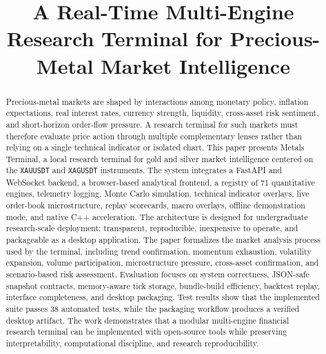 \documentclass[conference]{IEEEtran}
\begin{document}
\pagestyle{fancy}
\fancyhf{}
\fancyhead[R]{\scriptsize \thepage}
\renewcommand{\headrulewidth}{0pt}
\setlength{\headheight}{13.6pt}

\title{A Real-Time Multi-Engine Research Terminal for Precious-Metal Market Intelligence}

\author{
}

\maketitle
\thispagestyle{fancy}

\begin{abstract}
Precious-metal markets are shaped by interactions among monetary policy,
inflation expectations, real interest rates, currency strength, liquidity,
cross-asset risk sentiment, and short-horizon order-flow pressure. A research
terminal for such markets must therefore evaluate price action through
multiple complementary lenses rather than relying on a single technical
indicator or isolated chart. This paper presents Metals Terminal, a local
research terminal for gold and silver market intelligence centered on the
\texttt{XAUUSDT} and \texttt{XAGUSDT} instruments. The system integrates a
FastAPI and WebSocket backend, a browser-based analytical frontend, a
registry of 71 quantitative engines, telemetry logging, Monte Carlo
simulation, technical indicator overlays, live order-book microstructure,
replay scorecards, macro overlays, offline demonstration mode, and native C++
acceleration. The architecture is designed for undergraduate research-scale
deployment: transparent, reproducible, inexpensive to operate, and
packageable as a desktop application. The paper formalizes the market
analysis process used by the terminal, including trend confirmation,
momentum exhaustion, volatility expansion, volume participation,
microstructure pressure, cross-asset confirmation, and scenario-based risk
assessment. Evaluation focuses on system correctness, JSON-safe snapshot
contracts, memory-aware tick storage, bundle-build efficiency, backtest
replay, interface completeness, and desktop packaging. Test results show that
the implemented suite passes 38 automated tests, while the packaging workflow
produces a verified desktop artifact. The work demonstrates that a modular
multi-engine financial research terminal can be implemented with open-source
tools while preserving interpretability, computational discipline, and
research reproducibility.
\end{abstract}
\end{document}
